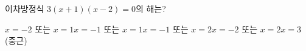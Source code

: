 이차방정식 $3(x+1)(x-2)=0$의 해는?
\begin{choicesii}{$x=-2$ 또는 $x=1$}{$x=-1$ 또는 $x=1$}{$x=-1$ 또는 $x=2$}{$x=-2$ 또는 $x=2$}{$x=3$(중근)}\end{choicesii}
